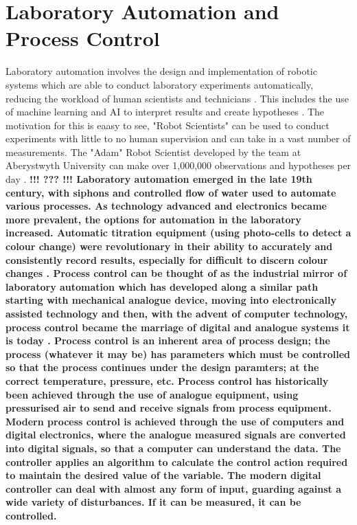 \documentclass[twoside,a4]{report}
\def\br{\newline \newline \noindent}
\def\cbh{\large\bfseries !!! ??? !!! \normalsize\normalfont}
\begin{document}
	\section{Laboratory Automation and Process Control} %
	Laboratory automation involves the design and implementation of robotic systems which are able to conduct laboratory experiments automatically, reducing the workload of human scientists and technicians \cite{backwhatisauto}. This includes the use of machine learning and AI to interpret results and create hypotheses \cite{backlitrevai, backbaconauto, backlabauto}. The motivation for this is eaasy to see, "Robot Scientists" can be used to conduct experiments with little to no human supervision and can take in a vast number of measurements. The "Adam" Robot Scientist developed by the team at Aberystwyth University can make over 1,000,000 observations and hypotheses per day \cite{backontorobsci}. \cbh %
	\br
	Laboratory automation emerged in the late 19th century, with siphons and controlled flow of water used to automate various processes. As technology advanced and electronics became more prevalent, the options for automation in the laboratory increased. Automatic titration equipment (using photo-cells to detect a colour change) were revolutionary in their ability to accurately and consistently record results, especially for difficult to discern colour changes \cite{backlabautohisto}. \br
	Process control can be thought of as the industrial mirror of laboratory automation which has developed along a similar path starting with mechanical analogue device, moving into electronically assisted technology and then, with the advent of computer technology, process control became the marriage of digital and analogue systems it is today \cite{backautocontrolhisto}.
	Process control is an inherent area of process design; the process (whatever it may be) has parameters which must be controlled so that the process continues under the design paramters; at the correct temperature, pressure, etc. Process control has historically been achieved through the use of analogue equipment, using pressurised air to send and receive signals from process equipment. Modern process control is achieved through the use of computers and digital electronics, where the analogue measured signals are converted into digital signals, so that a computer can understand the data. The controller applies an algorithm to calculate the control action required to maintain the desired value of the variable. The modern digital controller can deal with almost any form of input, guarding against a wide variety of disturbances. If it can be measured, it can be controlled.\br
\end{document}
